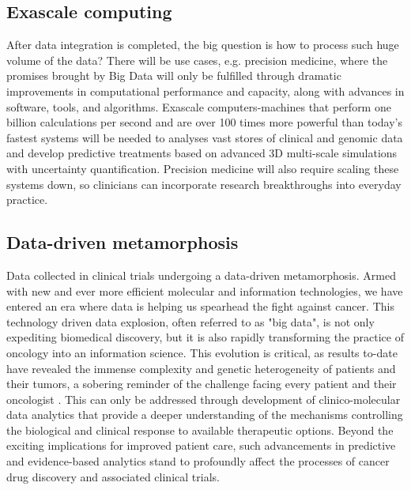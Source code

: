 \documentclass[sigconf]{acmart}
\begin{document}
\subsection{Exascale computing}
After data integration is completed, the big question is how to process
such huge volume of the data? There will be use cases, e.g. precision
medicine, where the promises brought by Big Data will only be fulfilled
through dramatic improvements in computational performance and capacity,
along with advances in software, tools, and algorithms. Exascale
computers-machines that perform one billion calculations per second and
are over 100 times more powerful than today's fastest systems will be
needed to analyses vast stores of clinical and genomic data and develop
predictive treatments based on advanced 3D multi-scale simulations with
uncertainty quantification. Precision medicine will also require scaling
these systems down, so clinicians can incorporate research breakthroughs
into everyday practice. \cite{TR04}

\subsection{Data-driven metamorphosis}
Data collected in clinical trials undergoing a data-driven 
metamorphosis. Armed with new and ever more efficient molecular 
and information technologies, we have entered an era where data is
helping us spearhead the fight against cancer. This technology 
driven data explosion, often referred to as "big data", is not only
expediting biomedical discovery, but it is also rapidly transforming
the practice of oncology into an information science. This evolution
is critical, as results to-date have revealed the immense complexity
and genetic heterogeneity of patients and their tumors, a sobering
reminder of the challenge facing every patient and their oncologist
. This can only be addressed through development of clinico-molecular
data analytics that provide a deeper understanding of the mechanisms
controlling the biological and clinical response to available 
therapeutic options. Beyond the exciting implications for improved 
patient care, such advancements in predictive and evidence-based 
analytics stand to profoundly affect the processes of cancer drug
discovery and associated clinical trials. \cite{TR01}
\end{document}
